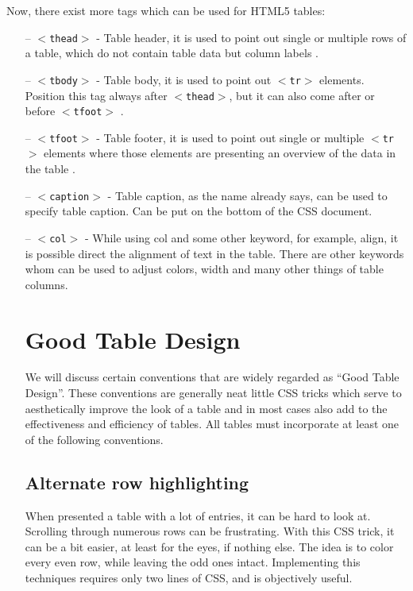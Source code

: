 Now, there exist more tags which can be used for HTML5 tables:
\begin{itemize}
    \item[--] $<$\texttt{thead}$>$ - Table header, it is used to point out single or multiple rows
of a table, which do not contain table data but column labels \parencite{8}.

    \item[--] $<$\texttt{tbody}$>$ - Table body, it is used to point out $<$\texttt{tr}$>$ elements. Position this tag
always after $<$\texttt{thead}$>$, but it can also come after or before $<$\texttt{tfoot}$>$ \parencite{8}.

    \item[--] $<$\texttt{tfoot}$>$ - Table footer, it is used to point out single or multiple $<$\texttt{tr}$>$ elements
where those elements are presenting an overview  of the data in the table \parencite{8}.

    \item[--] $<$\texttt{caption}$>$ - Table caption, as the name already says, can be used to specify table caption.
Can be put on the bottom of the CSS document.

    \item[--] $<$\texttt{col}$>$ - While using col and some other keyword, for example, align, it is possible direct
the alignment of text in the table. There are other keywords whom can be used to adjust colors, width
and many other things of table columns.



\chapter{Good Table Design}
We will discuss certain conventions that are widely regarded as ``Good Table Design''. These conventions are generally neat little CSS tricks which serve to aesthetically improve the look of a table and in most cases also add to the effectiveness and efficiency of tables. All tables must incorporate at least one of the following conventions.


\section{Alternate row highlighting}
When presented a table with a lot of entries, it can be hard to look at. Scrolling through numerous rows can be frustrating.
With this CSS trick, it can be a bit easier, at least for the eyes, if nothing else. The idea is to color every even row, while leaving
the odd ones intact.
Implementing this techniques requires only two lines of CSS, and is objectively useful.



\end{itemize}
